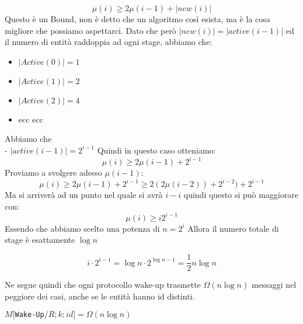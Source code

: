 $$\mu(i) \geq 2\mu(i-1) + |new(i)|$$ Questo è un Bound, non è detto che un
algoritmo così esista, ma è la cosa migliore che possiamo aspettarci. Dato che
però $|new(i)|=|active(i-1)|$ ed il numero di entità raddoppia ad ogni stage,
abbiamo che:
\begin{itemize}
    \item $|Active(0)| = 1$
    \item $|Active(1)| = 2$
    \item $|Active(2)| = 4$
    \item ecc ecc
\end{itemize}
Abbiamo che \\
- $|active(i-1)| = 2^{i-1}$ Quindi in questo caso otteniamo:
$$\mu(i) \geq 2\mu(i-1)+2^{i-1}$$ Proviamo a svolgere adesso $\mu(i-1)$:
$$\mu(i) \geq 2\mu(i-1)+2^{i-1} \geq 2(2\mu(i-2))+2^{i-2})+2^{i-1}$$ Ma si
arriverà ad un punto nel quale si avrà $i-i$ quindi questo si può maggiorare
con:
$$\mu(i) \geq i2^{i-1}$$ Essendo che abbiamo scelto una potenza di $n=2^i$
Allora il numero totale di stage è esattamente $\log n$

$$i \cdot 2^{i-1} = \log n \cdot 2^{\log n-1} = {\frac{1}{2}} n \log n$$

Ne segue quindi che ogni protocollo wake-up trasmette $\Omega(n \log n)$
messaggi nel peggiore dei casi, anche se le entità hanno id distinti.

\begin{center}
    $M[$\texttt{Wake-Up}$/R;k;id] = \Omega(n \log n)$
\end{center}

